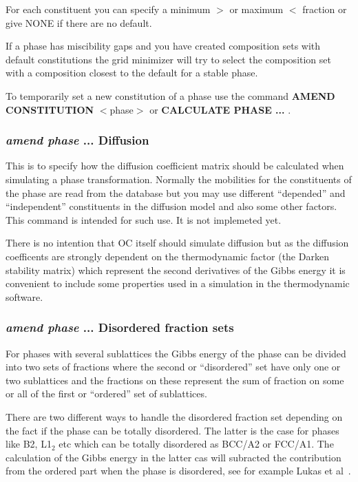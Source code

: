 \documentclass[11pt]{article}
\begin{document}
For each constituent you can specify a minimum $>$ or maximum $<$
fraction or give NONE if there are no default.

If a phase has miscibility gaps and you have created composition
sets with default constitutions the grid minimizer will try to select
the composition set with a composition closest to the default for a
stable phase.

To temporarily set a new constitution of a phase use the command {\bf
  AMEND CONSTITUTION} $<$phase$>$ or {\bf CALCULATE PHASE ... }.

\hypertarget{Add diffusion}{}
\subsubsection{{\em amend phase} ... Diffusion}

This is to specify how the diffusion coefficient matrix should be
calculated when simulating a phase transformation.  Normally the
mobilities for the constituents of the phase are read from the
database but you may use different ``depended'' and ``independent''
constituents in the diffusion model and also some other factors.  This
command is intended for such use.  It is not implemeted yet.

There is no intention that OC itself should simulate diffusion but as
the diffusion coefficents are strongly dependent on the thermodynamic
factor (the Darken stability matrix) which represent the second
derivatives of the Gibbs energy it is convenient to include some
properties used in a simulation in the thermodynamic software.

\hypertarget{Amend phase disordfrac}{}
\subsubsection{{\em amend phase} ... Disordered fraction sets}

For phases with several sublattices the Gibbs energy of the phase can
be divided into two sets of fractions where the second or
``disordered'' set have only one or two sublattices and the fractions
on these represent the sum of fraction on some or all of the first or
``ordered'' set of sublattices.

There are two different ways to handle the disordered fraction set
depending on the fact if the phase can be totally disordered.  The
latter is the case for phases like B2, L1$_2$ etc which can be totally
disordered as BCC/A2 or FCC/A1.  The calculation of the Gibbs energy
in the latter cas will subracted the contribution from the ordered
part when the phase is disordered, see for example Lukas et
al~\cite{07Luk}.
\end{document}
